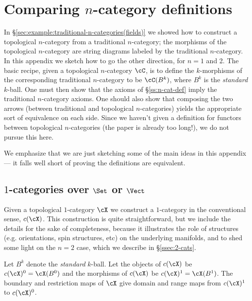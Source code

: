 
\section{Comparing $n$-category definitions}
\label{sec:comparing-defs}

In \S\ref{sec:example:traditional-n-categories(fields)} we showed how to construct
a topological $n$-category from a traditional $n$-category; the morphisms of the 
topological $n$-category are string diagrams labeled by the traditional $n$-category.
In this appendix we sketch how to go the other direction, for $n=1$ and 2.
The basic recipe, given a topological $n$-category $\cC$, is to define the $k$-morphisms
of the corresponding traditional $n$-category to be $\cC(B^k)$, where
$B^k$ is the {\it standard} $k$-ball.
One must then show that the axioms of \S\ref{ss:n-cat-def} imply the traditional $n$-category axioms.
One should also show that composing the two arrows (between traditional and topological $n$-categories)
yields the appropriate sort of equivalence on each side.
Since we haven't given a definition for functors between topological $n$-categories
(the paper is already too long!), we do not pursue this here.

We emphasize that we are just sketching some of the main ideas in this appendix ---
it falls well short of proving the definitions are equivalent.


\subsection{$1$-categories over $\Set$ or $\Vect$}
\label{ssec:1-cats}
Given a topological $1$-category $\cX$ we construct a $1$-category in the conventional sense, $c(\cX)$.
This construction is quite straightforward, but we include the details for the sake of completeness, 
because it illustrates the role of structures (e.g. orientations, spin structures, etc) 
on the underlying manifolds, and 
to shed some light on the $n=2$ case, which we describe in \S \ref{ssec:2-cats}.

Let $B^k$ denote the \emph{standard} $k$-ball.
Let the objects of $c(\cX)$ be $c(\cX)^0 = \cX(B^0)$ and the morphisms of $c(\cX)$ be $c(\cX)^1 = \cX(B^1)$.
The boundary and restriction maps of $\cX$ give domain and range maps from $c(\cX)^1$ to $c(\cX)^0$.

